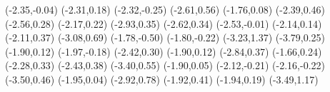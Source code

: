 \psdot[](-2.35,-0.04)
\psdot[](-2.31,0.18)
\psdot[](-2.32,-0.25)
\psdot[](-2.61,0.56)
\psdot[](-1.76,0.08)
\psdot[](-2.39,0.46)
\psdot[](-2.56,0.28)
\psdot[](-2.17,0.22)
\psdot[](-2.93,0.35)
\psdot[](-2.62,0.34)
\psdot[](-2.53,-0.01)
\psdot[](-2.14,0.14)
\psdot[](-2.11,0.37)
\psdot[](-3.08,0.69)
\psdot[](-1.78,-0.50)
\psdot[](-1.80,-0.22)
\psdot[](-3.23,1.37)
\psdot[](-3.79,0.25)
\psdot[](-1.90,0.12)
\psdot[](-1.97,-0.18)
\psdot[](-2.42,0.30)
\psdot[](-1.90,0.12)
\psdot[](-2.84,0.37)
\psdot[](-1.66,0.24)
\psdot[](-2.28,0.33)
\psdot[](-2.43,0.38)
\psdot[](-3.40,0.55)
\psdot[](-1.90,0.05)
\psdot[](-2.12,-0.21)
\psdot[](-2.16,-0.22)
\psdot[](-3.50,0.46)
\psdot[](-1.95,0.04)
\psdot[](-2.92,0.78)
\psdot[](-1.92,0.41)
\psdot[](-1.94,0.19)
\psdot[](-3.49,1.17)
